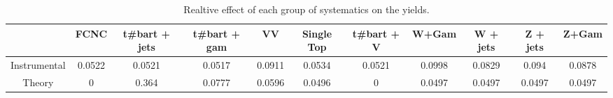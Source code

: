 \begin{table}[htbp]
\begin{center}
\begin{tabular}{|c|c|c|c|c|c|c|c|c|c|c|}
\hline 
      & FCNC      & t#bar{t} + jets      & t#bar{t} +  gam      & VV      & Single Top      & t#bar{t} + V      & W+Gam      & W + jets      & Z + jets      & Z+Gam \\ 
\hline 
 Instrumental & 0.0522 & 0.0521 & 0.0517 & 0.0911 & 0.0534 & 0.0521 & 0.0998 & 0.0829 & 0.094 & 0.0878 \\ 
 Theory & 0 & 0.364 & 0.0777 & 0.0596 & 0.0496 & 0 & 0.0497 & 0.0497 & 0.0497 & 0.0497 \\ 
\hline 
\end{tabular} 
\caption{Realtive effect of each group of systematics on the yields.} 
\end{center} 
\end{table} 
